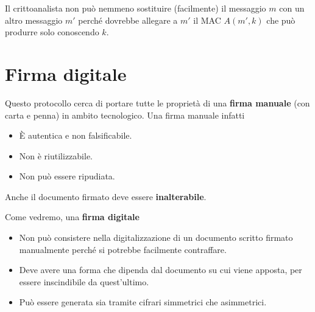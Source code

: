Il crittoanalista non pu\`o nemmeno sostituire (facilmente) il messaggio $m$ con un altro messaggio $m'$ perch\'e
dovrebbe allegare a $m'$ il MAC $A(m', k)$ che pu\`o produrre solo conoscendo $k$.

\section{Firma digitale}
Questo protocollo cerca di portare tutte le propriet\`a di una \textbf{firma manuale} (con carta e penna) in ambito
tecnologico. Una firma manuale infatti
\begin{itemize}
	\item \`E autentica e non falsificabile.
	\item Non \`e riutilizzabile.
	\item Non pu\`o essere ripudiata.
\end{itemize}
Anche il documento firmato deve essere \textbf{inalterabile}.

Come vedremo, una \textbf{firma digitale}
\begin{itemize}
	\item Non pu\`o consistere nella digitalizzazione di un documento scritto firmato manualmente perch\'e si
	      potrebbe facilmente contraffare.
	\item Deve avere una forma che dipenda dal documento su cui viene apposta, per essere inscindibile da
	      quest'ultimo.
	\item Pu\`o essere generata sia tramite cifrari simmetrici che asimmetrici.
\end{itemize}